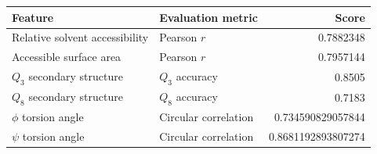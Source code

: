 \documentclass[10pt, british, luatex]{beamer}
\begin{document}
\begin{frame}
	\tiny%
	\begin{tabular*}{\linewidth}{@{\extracolsep{\fill}}llr}%
		\toprule
		Feature                        & Evaluation metric      & Score                     \\
		\midrule
		Relative solvent accessibility & Pearson $r$            & \num{0.7882348}           \\
		Accessible surface area        & Pearson $r$            & \num{0.7957144}           \\
		$Q_3$ secondary structure      & $Q_3$ accuracy         & \num{0.8505}              \\
		$Q_8$ secondary structure      & $Q_8$ accuracy         & \num{0.7183}              \\
		$\phi$ torsion angle           & Circular correlation   & \num{0.734590829057844}   \\
		$\psi$ torsion angle           & Circular correlation   & \num{0.8681192893807274}  \\
		\bottomrule
	\end{tabular*}%
\end{frame}
\end{document}
